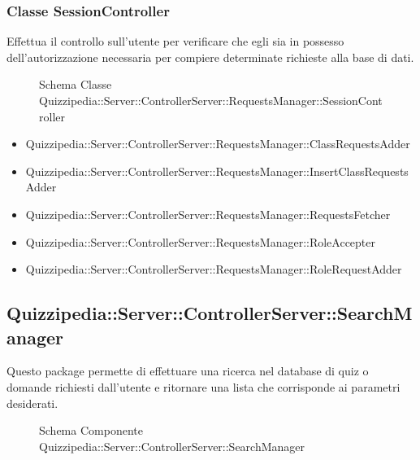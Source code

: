 \subsubsection{Classe SessionController}
Effettua il controllo sull'utente per verificare che egli sia in possesso dell'autorizzazione necessaria per compiere determinate richieste alla base di dati.
\begin{figure}[H]
\centering
\noindent{}
\caption{Schema Classe Quizzipedia::Server::ControllerServer::RequestsManager::SessionController}
\end{figure}
\begin{itemize}
\item Quizzipedia::Server::ControllerServer::RequestsManager::ClassRequestsAdder
\item Quizzipedia::Server::ControllerServer::RequestsManager::InsertClassRequestsAdder
\item Quizzipedia::Server::ControllerServer::RequestsManager::RequestsFetcher
\item Quizzipedia::Server::ControllerServer::RequestsManager::RoleAccepter
\item Quizzipedia::Server::ControllerServer::RequestsManager::RoleRequestAdder
\end{itemize}
\subsection{Quizzipedia::Server::ControllerServer::SearchManager}
Questo package permette di effettuare una ricerca nel database di quiz o domande richiesti dall'utente e ritornare una lista che corrisponde ai parametri desiderati.
\begin{figure}[H]
\centering
\noindent{}
\caption[Quizzipedia::Server::ControllerServer::SearchManager]{Schema Componente Quizzipedia::Server::ControllerServer::SearchManager}
\end{figure}
